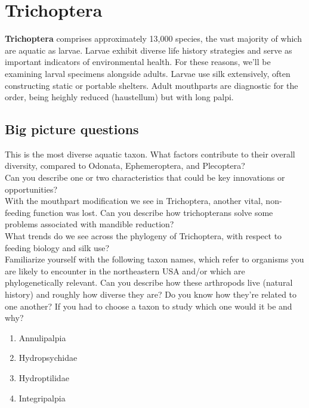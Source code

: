 \documentclass[letterpaper, 11pt]{article}
\begin{document}
\FloatBarrier
\section{Trichoptera}

\noindent{}\textbf{Trichoptera} comprises approximately 13,000 species, 
the vast majority of which are aquatic as larvae. Larvae exhibit diverse life history strategies and serve as important indicators of environmental health. For these reasons, we'll be examining larval specimens alongside adults. Larvae use silk extensively, often constructing static or portable shelters. Adult mouthparts are diagnostic for the order, being heighly reduced (haustellum) but with long palpi.

\subsection*{Big picture questions}

\noindent{}This is the most diverse aquatic taxon. What factors contribute to their overall diversity, compared to Odonata, Ephemeroptera, and Plecoptera?\\

\noindent{}Can you describe one or two characteristics that could be key innovations or opportunities?\\

\noindent{}With the mouthpart modification we see in Trichoptera, another vital, non-feeding function was lost. Can you describe how trichopterans solve some problems associated with mandible reduction?\\

\noindent{}What trends do we see across the phylogeny of Trichoptera, with respect to feeding biology and silk use? \\

\noindent{}Familiarize yourself with the following taxon names, which refer to organisms you are likely to encounter in the northeastern USA and/or which are phylogenetically relevant. Can you describe how these arthropods live (natural history) and roughly how diverse they are? Do you know how they're related to one another? If you had to choose a taxon to study which one would it be and why?
\begin{enumerate} 
\item Annulipalpia
\item Hydropsychidae
\item Hydroptilidae
\item Integripalpia
\end{enumerate}
\end{document}
